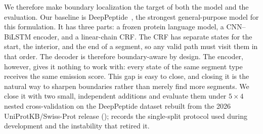 \documentclass{article}
\begin{document}
We therefore make boundary localization the target of both the model and the evaluation. Our baseline is DeepPeptide~\citep{deeppeptide2023}, the strongest general-purpose model for this formulation. It has three parts: a frozen protein language model, a CNN--BiLSTM encoder, and a linear-chain CRF. The CRF has separate states for the start, the interior, and the end of a segment, so any valid path must visit them in that order. The decoder is therefore boundary-aware by design. The encoder, however, gives it nothing to work with: every state of the same segment type receives the same emission score. This gap is easy to close, and closing it is the natural way to sharpen boundaries rather than merely find more segments. We close it with two small, independent additions and evaluate them under $5\times4$ nested cross-validation on the DeepPeptide dataset rebuilt from the 2026 UniProtKB/Swiss-Prot release ();  records the single-split protocol used during development and the instability that retired it.



\end{document}
